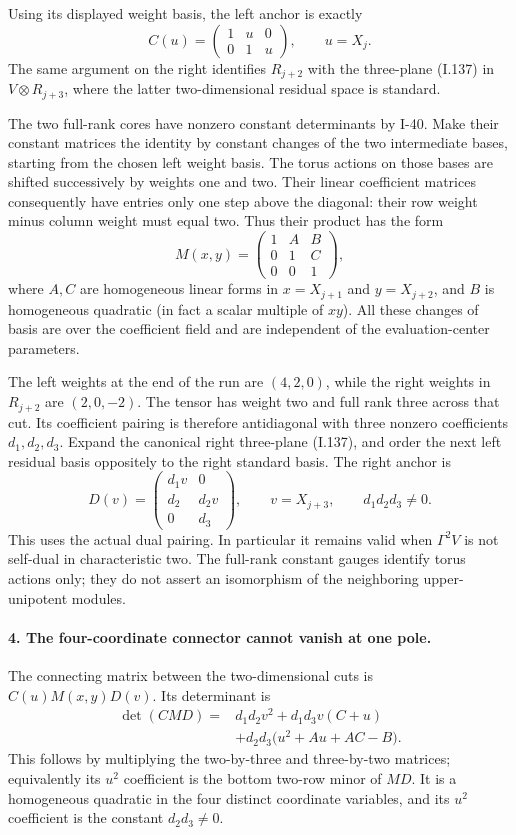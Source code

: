 Using its displayed weight basis, the left anchor is exactly
\[
 C(u)=\begin{pmatrix}1&u&0\\0&1&u\end{pmatrix},
 \qquad u=X_j.
 \tag{I.138}
\]
The same argument on the right identifies $R_{j+2}$ with the
three-plane (I.137) in $V\otimes R_{j+3}$, where the latter
two-dimensional residual space is standard.

The two full-rank cores have nonzero constant determinants by
I-40. Make their constant matrices the identity by constant
changes of the two intermediate bases, starting from the chosen
left weight basis. The torus actions on those bases are shifted
successively by weights one and two. Their linear coefficient
matrices consequently have entries only one step above the
diagonal: their row weight minus column weight must equal two.
Thus their product has the form
\[
 M(x,y)=
 \begin{pmatrix}1&A&B\\0&1&C\\0&0&1\end{pmatrix},
 \tag{I.139}
\]
where $A,C$ are homogeneous linear forms in $x=X_{j+1}$ and
$y=X_{j+2}$, and $B$ is homogeneous quadratic (in fact a scalar
multiple of $xy$). All these changes of basis are over the
coefficient field and are independent of the evaluation-center
parameters.

The left weights at the end of the run are $(4,2,0)$, while
the right weights in $R_{j+2}$ are $(2,0,-2)$. The tensor has
weight two and full rank three across that cut. Its coefficient
pairing is therefore antidiagonal with three nonzero coefficients
$d_1,d_2,d_3$. Expand the canonical right three-plane (I.137),
and order the next left residual basis oppositely to the right
standard basis. The right anchor is
\[
 D(v)=\begin{pmatrix}d_1v&0\\d_2&d_2v\\0&d_3\end{pmatrix},
 \qquad v=X_{j+3},\qquad d_1d_2d_3\ne0.
 \tag{I.140}
\]
This uses the actual dual pairing. In particular it remains
valid when $\Gamma^2V$ is not self-dual in characteristic two.
The full-rank constant gauges identify torus actions only;
they do not assert an isomorphism of the neighboring
upper-unipotent modules.

\paragraph{4. The four-coordinate connector cannot vanish at one pole.}
The connecting matrix between the two-dimensional cuts is
$C(u)M(x,y)D(v)$. Its determinant is
\[
 \begin{split}
 \det(CMD)={}&d_1d_2v^2+d_1d_3v(C+u)\\
 &+d_2d_3\bigl(u^2+Au+AC-B\bigr).
 \end{split}
 \tag{I.141}
\]
This follows by multiplying the two-by-three and three-by-two
matrices; equivalently its $u^2$ coefficient is the bottom
two-row minor of $MD$. It is a homogeneous quadratic in the
four distinct coordinate variables, and its $u^2$ coefficient
is the constant $d_2d_3\ne0$.

